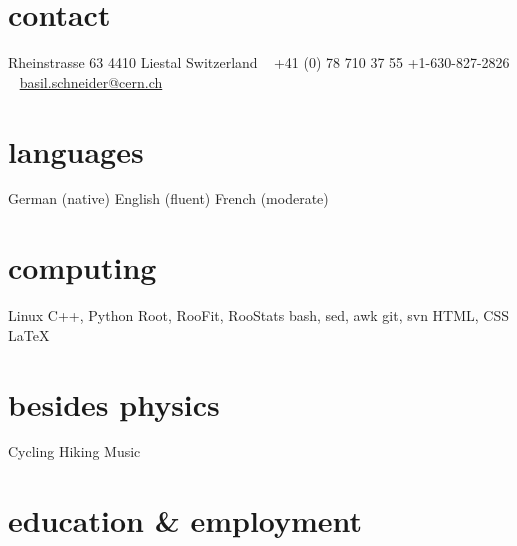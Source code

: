 \documentclass[]{cv} %
\begin{document}


\begin{aside} %
  \section{contact}
  Rheinstrasse 63
  4410 Liestal
  Switzerland
  ~
  +41 (0) 78 710 37 55
  +1-630-827-2826
  ~
  \href{mailto:basil.schneider@cern.ch}{basil.schneider@cern.ch}
  \section{languages}
  German (native)
  English (fluent)
  French (moderate)
  \section{computing}
  Linux
  C++, Python
  Root, RooFit, RooStats
  bash, sed, awk
  git, svn
  HTML, CSS
  \LaTeX
  \section{besides physics}
  Cycling
  Hiking
  Music
\end{aside}


\section{education \& employment}
\end{document}
